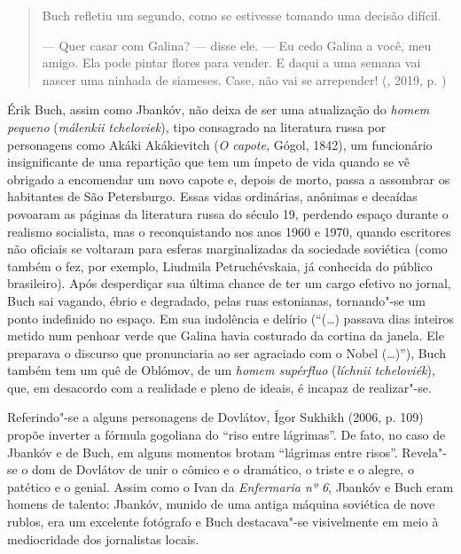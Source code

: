 \begin{quotation}
Buch refletiu um segundo, como se estivesse tomando uma decisão difícil.

--- Quer casar com Galina? --- disse ele. --- Eu cedo Galina a você, meu
amigo. Ela pode pintar flores para vender. E daqui a uma semana vai
nascer uma ninhada de siameses. Case, não vai se arrepender! 
{}(, 2019, p. \pageref{ref5})
\end{quotation}

Érik Buch, assim como Jbankóv, não deixa de ser uma atualização do
\emph{homem pequeno} (\emph{málenkii tcheloviek}), tipo consagrado na
literatura russa por personagens como Akáki Akákievitch (\emph{O
capote,} Gógol, 1842), um funcionário insignificante de uma
repartição que tem um ímpeto de vida quando se vê obrigado a encomendar
um novo capote e, depois de morto, passa a assombrar os habitantes de
São Petersburgo. Essas vidas ordinárias, anônimas e decaídas povoaram as
páginas da literatura russa do século 19, perdendo espaço durante o
realismo socialista, mas o reconquistando nos anos 1960 e 1970, quando
escritores não oficiais se voltaram para esferas marginalizadas da
sociedade soviética (como também o fez, por exemplo, Liudmila
Petruchévskaia, já conhecida do público brasileiro). Após desperdiçar
sua última chance de ter um cargo efetivo no jornal, Buch sai vagando,
ébrio e degradado, pelas ruas estonianas, tornando"-se um ponto
indefinido no espaço. Em sua indolência e delírio (``(\ldots{}) passava dias
inteiros metido num penhoar verde que Galina havia costurado da cortina
da janela. Ele preparava o discurso que pronunciaria ao ser agraciado
com o Nobel (\ldots{})''), Buch também tem um quê de Oblómov, de um
\emph{homem supérfluo} (\emph{líchnii tcheloviék}), que, em desacordo
com a realidade e pleno de ideais, é incapaz de realizar"-se.

Referindo"-se a alguns personagens de Dovlátov, Ígor Sukhikh (2006, p.
109) propõe inverter a fórmula gogoliana do ``riso entre lágrimas''. De
fato, no caso de Jbankóv e de Buch, em alguns momentos brotam ``lágrimas
entre risos''. Revela"-se o dom de Dovlátov de unir o cômico e o
dramático, o triste e o alegre, o patético e o genial. Assim como o Ivan
da \emph{Enfermaria nº 6}, Jbankóv e Buch eram homens de talento:
Jbankóv, munido de uma antiga máquina soviética de nove rublos, era um
excelente fotógrafo e Buch destacava"-se visivelmente em meio à
mediocridade dos jornalistas locais.

